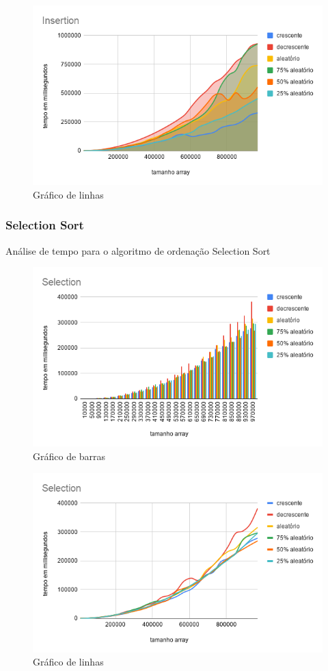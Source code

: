 \documentclass[a4paper, 12pt]{article}
\begin{document}
\begin{figure}[!h]
	\caption{ Gráfico de linhas }
	\label{fig:insertion2}
	\centering
	\includegraphics[width=1.1\textwidth, height=0.57\textwidth]{Insertion_linha}
\end{figure}


		\newpage
	\subsubsection{Selection Sort}
	Análise de tempo para o algoritmo de ordenação Selection Sort

		\begin{figure}[!h]
			\caption{ Gráfico de barras }
			\label{fig:selection1}
			\centering
	\includegraphics[width=1.1\textwidth, height=0.60\textwidth]{Selection}
		\end{figure}
		\begin{figure}[!h]
			\caption{ Gráfico de linhas }
			\label{fig:selection2}
			\centering
	\includegraphics[width=1.1\textwidth, height=0.57\textwidth]{Selection_linha}
		\end{figure}
\end{document}
